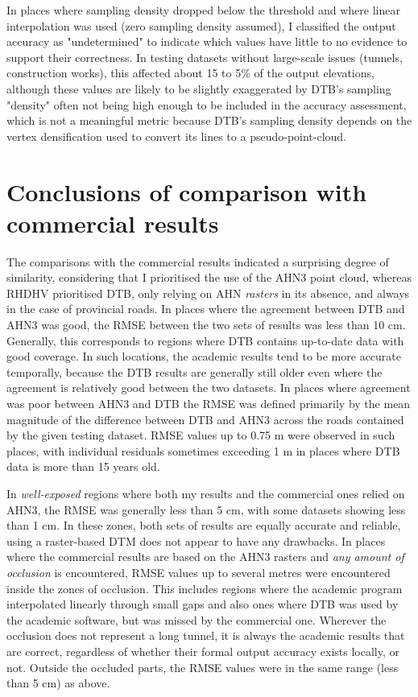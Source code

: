 In places where sampling density dropped below the threshold and where linear interpolation was used (zero sampling density assumed), I classified the output accuracy as "undetermined" to indicate which values have little to no evidence to support their correctness. In testing datasets without large-scale issues (tunnels, construction works), this affected about 15 to 5\% of the output elevations, although these values are likely to be slightly exaggerated by DTB's sampling "density" often not being high enough to be included in the accuracy assessment, which is not a meaningful metric because DTB's sampling density depends on the vertex densification used to convert its lines to a pseudo-point-cloud.

\section{Conclusions of comparison with commercial results}
\label{sec:conclusionscomparison}

The comparisons with the commercial results indicated a surprising degree of similarity, considering that I prioritised the use of the AHN3 point cloud, whereas RHDHV prioritised DTB, only relying on AHN \textit{rasters} in its absence, and always in the case of provincial roads. In places where the agreement between DTB and AHN3 was good, the RMSE between the two sets of results was less than 10 cm. Generally, this corresponds to regions where DTB contains up-to-date data with good coverage. In such locations, the academic results tend to be more accurate temporally, because the DTB results are generally still older even where the agreement is relatively good between the two datasets. In places where agreement was poor between AHN3 and DTB the RMSE was defined primarily by the mean magnitude of the difference between DTB and AHN3 across the roads contained by the given testing dataset. RMSE values up to 0.75 m were observed in such places, with individual residuals sometimes exceeding 1 m in places where DTB data is more than 15 years old.

In \textit{well-exposed} regions where both my results and the commercial ones relied on AHN3, the RMSE was generally less than 5 cm, with some datasets showing less than 1 cm. In these zones, both sets of results are equally accurate and reliable, using a raster-based DTM does not appear to have any drawbacks. In places where the commercial results are based on the AHN3 rasters and \textit{any amount of occlusion} is encountered, RMSE values up to several metres were encountered inside the zones of occlusion. This includes regions where the academic program interpolated linearly through small gaps and also ones where DTB was used by the academic software, but was missed by the commercial one. Wherever the occlusion does not represent a long tunnel, it is always the academic results that are correct, regardless of whether their formal output accuracy exists locally, or not. Outside the occluded parts, the RMSE values were in the same range (less than 5 cm) as above.

